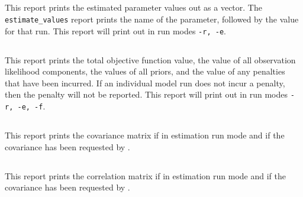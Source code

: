 \subsection{}\label{sec:Report-EstimateValue}

This report prints the estimated parameter values out as a vector. The \texttt{estimate\_values} report prints the name of the parameter, followed by the value for that run. This report will print out in run modes \texttt{-r, -e}.

\subsection{}\label{sec:Report-ObjectiveFunction}

This report prints the total objective function value, the value of all observation likelihood components, the values of all priors, and the value of any penalties that have been incurred. If an individual model run does not incur a penalty, then the penalty will not be reported. This report will print out in run modes \texttt{-r, -e, -f}.

\subsection{}\label{sec:Report-CovarianceMatrix}

This report prints the covariance matrix if in estimation run mode and if the covariance has been requested by .

\subsection{}\label{sec:Report-CorrelationMatrix}

This report prints the correlation matrix if in estimation run mode and if the covariance has been requested by .

\subsection{}\label{sec:Report-HessianMatrix}

